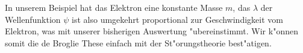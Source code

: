 \begin{refsection}
In unserem Beispiel hat das Elektron eine konstante Masse $m$,
das $\lambda$ der Wellenfunktion $\psi$ ist also umgekehrt proportional zur Geschwindigkeit vom Elektron,
was mit unserer bisherigen Auswertung "ubereinstimmt.
Wir k"onnen somit die de Broglie These einfach mit der St"orungstheorie best"atigen.






\printbibliography[heading=subbibliography]
\end{refsection}
